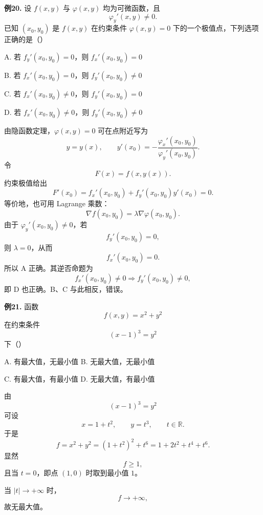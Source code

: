 \begin{problemblock}
\textbf{例20.} 设 \(f(x,y)\) 与 \(\varphi(x,y)\) 均为可微函数，且
\[
\varphi_y'(x,y)\ne0.
\]
已知 \((x_0,y_0)\) 是 \(f(x,y)\) 在约束条件 \(\varphi(x,y)=0\) 下的一个极值点，下列选项正确的是（\quad）

A. 若 \(f_y'(x_0,y_0)=0\)，则 \(f_x'(x_0,y_0)=0\)

B. 若 \(f_x'(x_0,y_0)=0\)，则 \(f_y'(x_0,y_0)\ne0\)

C. 若 \(f_x'(x_0,y_0)\ne0\)，则 \(f_y'(x_0,y_0)=0\)

D. 若 \(f_x'(x_0,y_0)\ne0\)，则 \(f_y'(x_0,y_0)\ne0\)
\end{problemblock}
\begin{solutionblock}
由隐函数定理，\(\varphi(x,y)=0\) 可在点附近写为
\[
y=y(x),
\qquad
y'(x_0)=-\frac{\varphi_x'(x_0,y_0)}{\varphi_y'(x_0,y_0)}.
\]
令
\[
F(x)=f(x,y(x)).
\]
约束极值给出
\[
F'(x_0)=f_x'(x_0,y_0)+f_y'(x_0,y_0)y'(x_0)=0.
\]
等价地，也可用 Lagrange 乘数：
\[
\nabla f(x_0,y_0)=\lambda\nabla\varphi(x_0,y_0).
\]
由于 \(\varphi_y'(x_0,y_0)\ne0\)，若
\[
f_y'(x_0,y_0)=0,
\]
则 \(\lambda=0\)，从而
\[
f_x'(x_0,y_0)=0.
\]
所以 A 正确。其逆否命题为
\[
f_x'(x_0,y_0)\ne0\Rightarrow f_y'(x_0,y_0)\ne0,
\]
即 D 也正确。B、C 与此相反，错误。
\end{solutionblock}

\begin{problemblock}
\textbf{例21.} 函数
\[
f(x,y)=x^2+y^2
\]
在约束条件
\[
(x-1)^3=y^2
\]
下（\quad）

A. 有最大值，无最小值\qquad
B. 无最大值，无最小值

C. 有最大值，有最小值\qquad
D. 无最大值，有最小值
\end{problemblock}
\begin{solutionblock}
由
\[
(x-1)^3=y^2
\]
可设
\[
x=1+t^2,\qquad y=t^3,\qquad t\in\mathbb{R}.
\]
于是
\[
f=x^2+y^2=(1+t^2)^2+t^6
=1+2t^2+t^4+t^6.
\]
显然
\[
f\ge1,
\]
且当 \(t=0\)，即点 \((1,0)\) 时取到最小值 \(1\)。

当 \(|t|\to+\infty\) 时，
\[
f\to+\infty,
\]
故无最大值。
\end{solutionblock}

